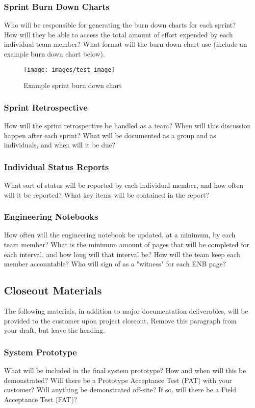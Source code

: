 \subsubsection{Sprint Burn Down Charts}
Who will be responsible for generating the burn down charts for each sprint? How will they be able to access the total amount of effort expended by each individual team member? What format will the burn down chart use (include an example burn down chart below).

\begin{figure}[h!]
    \centering
    \texttt{[image: images/test\_image]}
    \caption{Example sprint burn down chart}
\end{figure}

\subsubsection{Sprint Retrospective}
How will the sprint retrospective be handled as a team? When will this discussion happen after each sprint? What will be documented as a group and as individuals, and when will it be due?

\subsubsection{Individual Status Reports}
What sort of status will be reported by each individual member, and how often will it be reported? What key items will be contained in the report?

\subsubsection{Engineering Notebooks}
How often will the engineering notebook be updated, at a minimum, by each team member? What is the minimum amount of pages that will be completed for each interval, and how long will that interval be? How will the team keep each member accountable? Who will sign of as a "witness" for each ENB page?

\subsection{Closeout Materials}
The following materials, in addition to major documentation deliverables, will be provided to the customer upon project closeout. Remove this paragraph from your draft, but leave the heading.

\subsubsection{System Prototype}
What will be included in the final system prototype? How and when will this be demonstrated? Will there be a Prototype Acceptance Test (PAT) with your customer? Will anything be demonstrated off-site? If so, will there be a Field Acceptance Test (FAT)?

